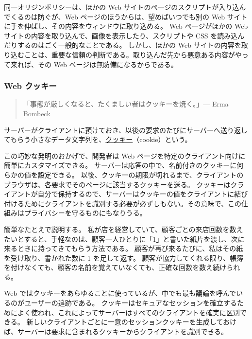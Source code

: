 \documentclass[uplatex]{jsarticle}
\def\label#1{}%
\begin{document}
同一オリジンポリシーは、ほかの Web サイトのページのスクリプトが入り込んでくるのは防ぐが、Web ページのほうからは、望めばいつでも別の Web サイトに手を伸ばし、その内容をウィンドウに取り込める。
Web ページがほかの Web サイトの内容を取り込んで、画像を表示したり、スクリプトや CSS を読み込んだりするのはごく一般的なことである。
しかし、ほかの Web サイトの内容を取り込むことは、重要な信頼の判断である。取り込んだ先から悪意ある内容がやって来れば、その Web ページは無防備になるからである。

\subsubsection{Web クッキー}\label{subsec:ch11-cookies}

\begin{quote}
「事態が厳しくなると、たくましい者はクッキーを焼く。」\hfill --- Erma Bombeck
\end{quote}

\begin{dfn}[クッキー]\label{dfn:ch11-cookie}
サーバーがクライアントに預けておき、以後の要求のたびにサーバーへ送り返してもらう小さなデータ文字列を、\underline{クッキー}（cookie）という。
\end{dfn}

この巧妙な発明のおかげで、開発者は Web ページを特定のクライアント向けに簡単にカスタマイズできる。
サーバーは応答の中で、名前付きのクッキーに何らかの値を設定できる。
以後、クッキーの期限が切れるまで、クライアントのブラウザは、各要求でそのページに該当するクッキーを送る。
クッキーはクライアントが自分で保持するので、サーバーはクッキーの値をクライアントに結び付けるためにクライアントを識別する必要が必ずしもない。その意味で、この仕組みはプライバシーを守るものにもなりうる。

\begin{exa}[来店回数を数える紙片]\label{exa:ch11-cookie-analogy}
簡単なたとえで説明する。
私が店を経営していて、顧客ごとの来店回数を数えたいとすると、手軽なのは、顧客一人ひとりに「1」と書いた紙片を渡し、次に来るときに持ってきてもらう方法である。
顧客が再び来るたびに、私はその紙を受け取り、書かれた数に 1 を足して返す。
顧客が協力してくれる限り、帳簿を付けなくても、顧客の名前を覚えていなくても、正確な回数を数え続けられる。
\end{exa}

Web ではクッキーをあらゆることに使っているが、中でも最も議論を呼んでいるのがユーザーの追跡である。
クッキーはセキュアなセッションを確立するためによく使われ、これによってサーバーはすべてのクライアントを確実に区別できる。
新しいクライアントごとに一意のセッションクッキーを生成しておけば、サーバーは要求に含まれるクッキーからクライアントを識別できる。
\end{document}
